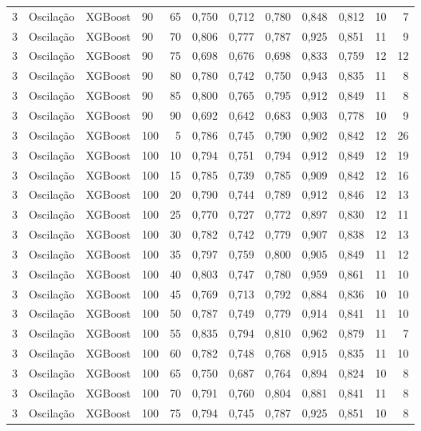 \begin{longtable}{ccclrrrrrrrr}
3 & Oscilação & XGBoost & 90 & 65 & 0,750 & 0,712 & 0,780 & 0,848 & 0,812 & 10 & 7 \\
3 & Oscilação & XGBoost & 90 & 70 & 0,806 & 0,777 & 0,787 & 0,925 & 0,851 & 11 & 9 \\
3 & Oscilação & XGBoost & 90 & 75 & 0,698 & 0,676 & 0,698 & 0,833 & 0,759 & 12 & 12 \\
3 & Oscilação & XGBoost & 90 & 80 & 0,780 & 0,742 & 0,750 & 0,943 & 0,835 & 11 & 8 \\
3 & Oscilação & XGBoost & 90 & 85 & 0,800 & 0,765 & 0,795 & 0,912 & 0,849 & 11 & 8 \\
3 & Oscilação & XGBoost & 90 & 90 & 0,692 & 0,642 & 0,683 & 0,903 & 0,778 & 10 & 9 \\
3 & Oscilação & XGBoost & 100 & 5 & 0,786 & 0,745 & 0,790 & 0,902 & 0,842 & 12 & 26 \\
3 & Oscilação & XGBoost & 100 & 10 & 0,794 & 0,751 & 0,794 & 0,912 & 0,849 & 12 & 19 \\
3 & Oscilação & XGBoost & 100 & 15 & 0,785 & 0,739 & 0,785 & 0,909 & 0,842 & 12 & 16 \\
3 & Oscilação & XGBoost & 100 & 20 & 0,790 & 0,744 & 0,789 & 0,912 & 0,846 & 12 & 13 \\
3 & Oscilação & XGBoost & 100 & 25 & 0,770 & 0,727 & 0,772 & 0,897 & 0,830 & 12 & 11 \\
3 & Oscilação & XGBoost & 100 & 30 & 0,782 & 0,742 & 0,779 & 0,907 & 0,838 & 12 & 13 \\
3 & Oscilação & XGBoost & 100 & 35 & 0,797 & 0,759 & 0,800 & 0,905 & 0,849 & 11 & 12 \\
3 & Oscilação & XGBoost & 100 & 40 & 0,803 & 0,747 & 0,780 & 0,959 & 0,861 & 11 & 10 \\
3 & Oscilação & XGBoost & 100 & 45 & 0,769 & 0,713 & 0,792 & 0,884 & 0,836 & 10 & 10 \\
3 & Oscilação & XGBoost & 100 & 50 & 0,787 & 0,749 & 0,779 & 0,914 & 0,841 & 11 & 10 \\
3 & Oscilação & XGBoost & 100 & 55 & 0,835 & 0,794 & 0,810 & 0,962 & 0,879 & 11 & 7 \\
3 & Oscilação & XGBoost & 100 & 60 & 0,782 & 0,748 & 0,768 & 0,915 & 0,835 & 11 & 10 \\
3 & Oscilação & XGBoost & 100 & 65 & 0,750 & 0,687 & 0,764 & 0,894 & 0,824 & 10 & 8 \\
3 & Oscilação & XGBoost & 100 & 70 & 0,791 & 0,760 & 0,804 & 0,881 & 0,841 & 11 & 8 \\
3 & Oscilação & XGBoost & 100 & 75 & 0,794 & 0,745 & 0,787 & 0,925 & 0,851 & 10 & 8 \\

\end{longtable}
